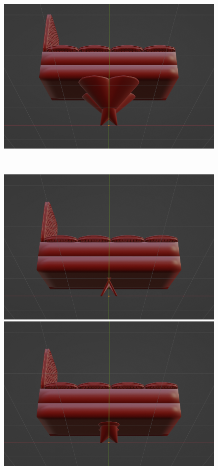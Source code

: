 \begin{figure}[h]
\begin{minipage}[b]{0.48\linewidth}
  \includegraphics[scale=0.17]{./imgs/sofaParamMean/legHeightMax.png}
 \end{minipage}\\
  \begin{minipage}[b]{0.48\linewidth}
  \centering
  \includegraphics[scale=0.17]{./imgs/sofaParamMean/legShapeMin.png}
 \end{minipage}
 \begin{minipage}[b]{0.48\linewidth}
  \centering
  \includegraphics[scale=0.17]{./imgs/sofaParamMean/legShapeMax.png}

\end{minipage}
\end{figure}
